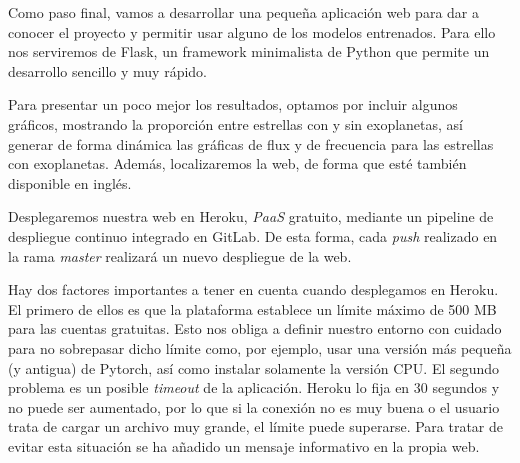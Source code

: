 Como paso final, vamos a desarrollar una pequeña aplicación web para dar a conocer el proyecto y permitir usar alguno de los modelos entrenados. Para ello nos serviremos de Flask, un framework minimalista de Python que permite un desarrollo sencillo y muy rápido.

Para presentar un poco mejor los resultados, optamos por incluir algunos gráficos, mostrando la proporción entre estrellas con y sin exoplanetas, así generar de forma dinámica las gráficas de flux y de frecuencia para las estrellas con exoplanetas. Además, localizaremos la web, de forma que esté también disponible en inglés.

Desplegaremos nuestra web en Heroku, \textit{PaaS} gratuito, mediante un pipeline de despliegue continuo integrado en GitLab. De esta forma, cada \textit{push} realizado en la rama \textit{master} realizará un nuevo despliegue de la web. 

Hay dos factores importantes a tener en cuenta cuando desplegamos en Heroku. El primero de ellos es que la plataforma establece un límite máximo de 500 MB para las cuentas gratuitas. Esto nos obliga a definir nuestro entorno con cuidado para no sobrepasar dicho límite como, por ejemplo, usar una versión más pequeña (y antigua) de Pytorch, así como instalar solamente la versión CPU. El segundo problema es un posible \textit{timeout} de la aplicación. Heroku lo fija en 30 segundos y no puede ser aumentado, por lo que si la conexión no es muy buena o el usuario trata de cargar un archivo muy grande, el límite puede superarse. Para tratar de evitar esta situación se ha añadido un mensaje informativo en la propia web.